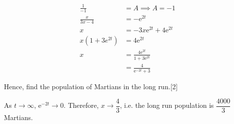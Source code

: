 \documentclass[12pt, a4 paper]{article}
\begin{document}
\begin{outline}[enumerate]
\begin{answer}
  \begin{align*}
   \frac{1}{-1}   & = A \implies A=-1                             \\
   \frac{x}{3x-4} & = -\mathrm{e}^{2t}                            \\
   x              & = -3x\mathrm{e}^{2t}+4\mathrm{e}^{2t}         \\
   x(1+3e^{2t})   & = 4\mathrm{e}^{2t}                            \\
   x              & = \frac{4\mathrm{e}^{2t}}{1+3\mathrm{e}^{2t}} \\
                  & = \frac{4}{\mathrm{e}^{-2t}+3}
  \end{align*}
 \end{answer}
 \2 Hence, find the population of Martians in the long run.\hfill[2]
 \begin{answer}
  As $t \rightarrow \infty$, $\mathrm{e}^{-2t} \rightarrow 0$. Therefore, $x \rightarrow \dfrac{4}{3}$, i.e. the long run population is $\dfrac{4000}{3}$ Martians.
 \end{answer}

\end{outline}
\end{document}
